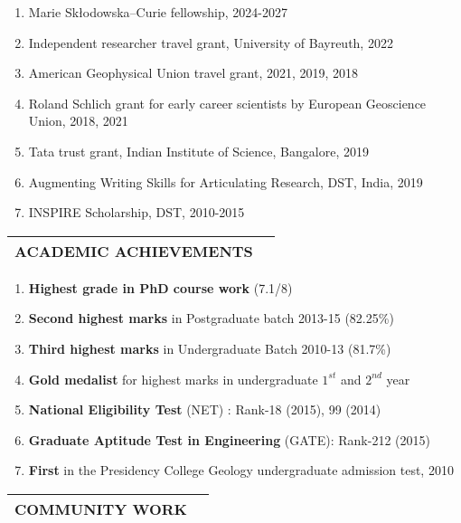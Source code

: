 \documentclass[11pt,a4paper]{article}
\begin{document}
\begin{enumerate}[noitemsep]
\item 
Marie Skłodowska–Curie fellowship, 2024-2027
\item Independent researcher travel grant, University of Bayreuth, 2022
\item American Geophysical Union travel grant, 2021, 2019, 2018
\item Roland Schlich grant for early career scientists by European Geoscience Union, 2018, 2021
\item Tata trust grant, Indian Institute of Science, Bangalore, 2019
\item Augmenting Writing Skills for Articulating Research, DST, India, 2019
\item INSPIRE Scholarship, DST, 2010-2015
\end{enumerate}

\vspace{-0.3 in}
\begin{longtable}{p{10cm} p{5cm}}
\hline
 \textbf{ACADEMIC ACHIEVEMENTS} & \\
\hline
\end{longtable}
\vspace{-0.3 in}
 \begin{enumerate}[noitemsep]
\item \textbf{Highest grade in PhD course work }(7.1/8) 
\item \textbf{Second highest marks} in Postgraduate batch 2013-15 (82.25\%) 
\item \textbf{Third highest marks} in Undergraduate Batch 2010-13 (81.7\%) 
\item \textbf{Gold medalist} for highest marks in undergraduate $1^{st}$ and $2^{nd}$ year
\item \textbf{National Eligibility Test} (NET) : Rank-18 (2015), 99 (2014)
\item \textbf{Graduate Aptitude Test in Engineering} (GATE): Rank-212 (2015)
\item \textbf{First} in the Presidency College Geology undergraduate admission test, 2010
\end{enumerate}
\vspace{-.3 in}
\begin{longtable}{p{5cm} p{10cm}}
\hline
 \textbf{COMMUNITY WORK} & \\
 \hline
\end{longtable}
\vspace{-0.2 in}
\end{document}
